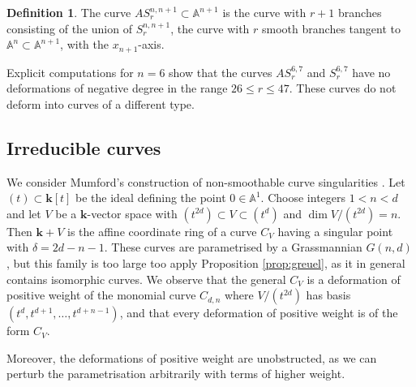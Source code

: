\documentclass{amsart}
\newcommand{\A}{\mathbb{A}}
\renewcommand{\k}{\mathbf{k}} %
\theoremstyle{definition}
\newtheorem{defn}[thm]{Definition}
\theoremstyle{remark}
\begin{document}
\begin{defn}
The curve  $AS_r^{n,n+1}\subset \A^{n+1}$ is the curve with $r+1$ branches
consisting of the union of $S_r^{n,n+1}$, the curve with $r$ smooth branches tangent to 
$\A^n\subset \A^{n+1}$, with the $x_{n+1}$-axis.
\end{defn}

Explicit computations for $n=6$ show that the curves
$AS_r^{6,7}$ and $S_r^{6,7}$ have no deformations of negative degree 
 in the range $26\leq r \leq 47$. These curves do not deform into curves of a different type.



\subsection{Irreducible curves}
We consider Mumford's construction of non-smoothable curve singularities \cite{Mu}. 
Let $(t)\subset \k[t]$ be the ideal defining the point
$0\in \A^1$. 
Choose integers $1<n<d$ and let $V$ be a $\k$-vector space
with $(t^{2d})\subset V \subset (t^d)$ and $\dim V/(t^{2d})=n$. Then $\k+V$ is the
affine coordinate ring of a curve $C_V$ having a singular point with $\delta = 2d-n-1$.
These curves  are parametrised by a Grassmannian $G(n,d)$, but this 
family is too large too apply Proposition \ref{prop:greuel}, as it in general contains isomorphic curves.
We observe
that the general $C_V$ is a deformation of positive weight of the monomial
curve $C_{d,n}$ where $V/(t^{2d})$ has basis $(t^d,t^{d+1},\dots,t^{d+n-1})$, and that every
deformation of positive weight is of the form $C_V$. 

Moreover, the deformations
of positive weight are unobstructed, as we can perturb the parametrisation
arbitrarily with terms of higher weight.
\end{document}
